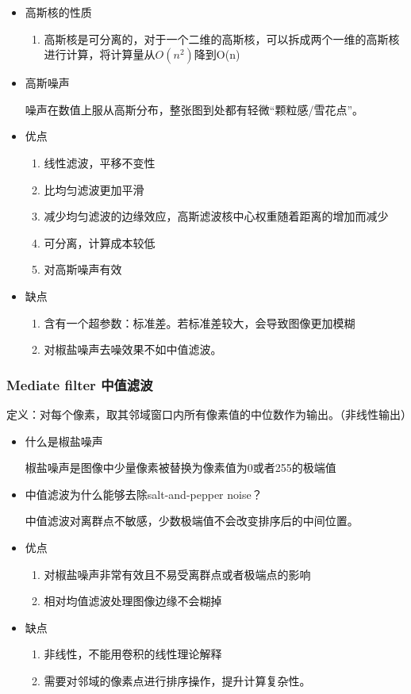 \documentclass[UTF8]{ctexart}
\begin{document}
\begin{itemize}
    \item 高斯核的性质
    \begin{enumerate}
        \item 高斯核是可分离的，对于一个二维的高斯核，可以拆成两个一维的高斯核进行计算，将计算量从$O(n^2)$降到O(n)
    \end{enumerate}
    \item 高斯噪声
    
    噪声在数值上服从高斯分布，整张图到处都有轻微“颗粒感/雪花点”。

    \item 优点
    \begin{enumerate}
        \item 线性滤波，平移不变性
        \item 比均匀滤波更加平滑
        \item 减少均匀滤波的边缘效应，高斯滤波核中心权重随着距离的增加而减少
        \item 可分离，计算成本较低
        \item 对高斯噪声有效
    \end{enumerate}
    \item 缺点
    \begin{enumerate}
        \item 含有一个超参数：标准差。若标准差较大，会导致图像更加模糊
        \item 对椒盐噪声去噪效果不如中值滤波。
    \end{enumerate}
\end{itemize}


\subsubsection{Mediate filter 中值滤波}

定义：对每个像素，取其邻域窗口内所有像素值的中位数作为输出。（非线性输出）

\begin{itemize}
    \item 什么是椒盐噪声
    
    椒盐噪声是图像中少量像素被替换为像素值为0或者255的极端值
    \item 中值滤波为什么能够去除salt-and-pepper noise？
    
    中值滤波对离群点不敏感，少数极端值不会改变排序后的中间位置。

    \item 优点
    \begin{enumerate}
        \item 对椒盐噪声非常有效且不易受离群点或者极端点的影响
        \item 相对均值滤波处理图像边缘不会糊掉
    \end{enumerate}

    \item 缺点
    \begin{enumerate}
        \item 非线性，不能用卷积的线性理论解释
        \item 需要对邻域的像素点进行排序操作，提升计算复杂性。
    \end{enumerate}
\end{itemize}
\end{document}

